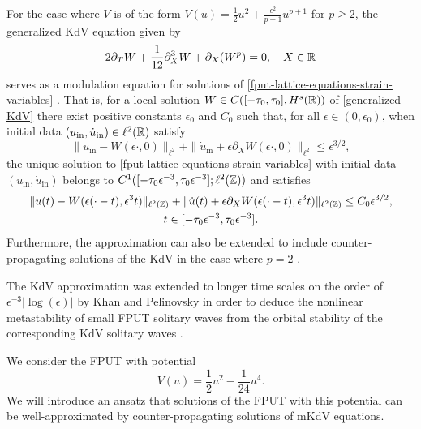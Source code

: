 For the case where \(V\) is of the form \(V(u) = \frac 1 2 u^2 + \frac{\epsilon^2}{p+1} u^{p+1}\) for \(p\geq 2\), the generalized KdV equation given by 
\begin{equation}\label{generalized-KdV}
	2 \partial_TW + \frac 1 {12} \partial_X^3 W + \partial_X(W^p) = 0,\quad X\in\mathbb{R}
\end{equation} 
serves as a modulation equation for solutions of \cref{fput-lattice-equations-strain-variables} \cite{bambusi2006metastability,friesecke1999solitary}. That is, for a local solution \(W\in C([-\tau_0,\tau_0],H^s(\mathbb{R}))\) of \cref{generalized-KdV} there exist positive constants \(\epsilon_0\) and \(C_0\) such that, for all \(\epsilon \in (0,\epsilon_0)\), when initial data \((u_{\mathrm{in} }, \dot u_{\mathrm{in}})\in\ell^2(\mathbb{R})\) satisfy
\begin{equation}
	\|u_{\mathrm{in}} - W(\epsilon\cdot, 0) \|_{\ell^2} + \| \dot u_{\mathrm{in}} + \epsilon \partial_X W(\epsilon\cdot, 0) \|_{\ell^2} \leq \epsilon^{3/2},
\end{equation}
the unique solution to \cref{fput-lattice-equations-strain-variables} with initial data \((u_{\mathrm{in} }, \dot u_{\mathrm{in}})\) belongs to \(C^1([-\tau_0\epsilon^{-3}, \tau_0 \epsilon^{-3}];\allowbreak \ell^2(\mathbb{Z}))\) and satisfies 
\begin{multline}
	\|u(t) - W(\epsilon (\cdot - t),\epsilon^3 t)\|_{\ell^2(\mathbb{Z})} + \| \dot u(t) + \epsilon \partial_X W(\epsilon(\cdot - t), \epsilon^3 t) \|_{\ell^2(\mathbb{Z})} \leq C_0 \epsilon^{3/2}, \\ t\in[-\tau_0 \epsilon^{-3},\tau_0 \epsilon^{-3}].
\end{multline}
Furthermore, the approximation can also be extended to include counter-propagating solutions of the KdV in the case where \(p=2\) \cite{schneider2000counter}.

The KdV approximation was extended to longer time scales on the order of \(\epsilon^{-3}|\log(\epsilon)|\) by Khan and Pelinovsky in order to deduce the nonlinear metastability of small FPUT solitary waves from the orbital stability of the corresponding KdV solitary waves \cite{khan2017long}.

We consider the FPUT with potential
\begin{equation}\label{truncated-potential}
	V(u) = \frac 1 2 u^2 - \frac{1} {24} u^4.
\end{equation}
We will introduce an ansatz that solutions of the FPUT with this potential can be well-approximated by counter-propagating solutions of mKdV equations.

